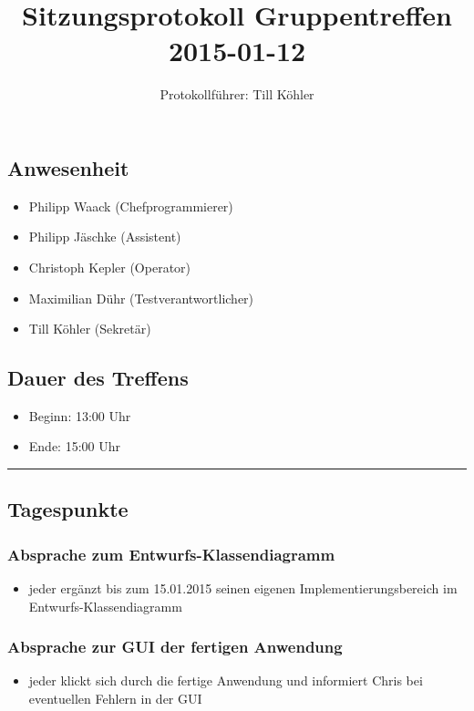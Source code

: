\documentclass[12pt,a4paper]{article}
\author{Protokollführer: Till Köhler}
\title{Sitzungsprotokoll Gruppentreffen 2015-01-12}
\date{}
\begin{document}
\maketitle

\subsection*{Anwesenheit}
\medskip
\begin{itemize}
\item Philipp Waack (Chefprogrammierer)
\item Philipp Jäschke (Assistent)
\item Christoph Kepler (Operator)
\item Maximilian Dühr (Testverantwortlicher)
\item Till Köhler (Sekretär)
\end{itemize}

\subsection*{Dauer des Treffens}
\medskip
\begin{itemize}
\item Beginn: 13:00 Uhr
\item Ende: 15:00 Uhr
\end{itemize}

\noindent\rule{\textwidth}{1pt}

\subsection*{Tagespunkte}
\medskip

\subsubsection*{Absprache zum Entwurfs-Klassendiagramm}
\begin{itemize}
\item jeder ergänzt bis zum 15.01.2015 seinen eigenen Implementierungsbereich im Entwurfs-Klassendiagramm
\end{itemize}

\subsubsection*{Absprache zur GUI der fertigen Anwendung}
\begin{itemize}
\item jeder klickt sich durch die fertige Anwendung und informiert Chris bei eventuellen Fehlern in der GUI
\end{itemize}
\end{document}
